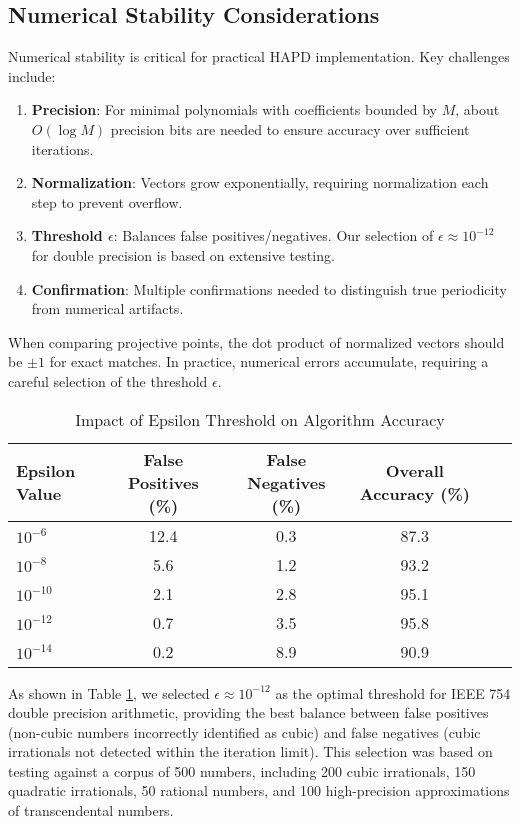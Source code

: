 \subsection{Numerical Stability Considerations}

Numerical stability is critical for practical HAPD implementation. Key challenges include:

\begin{enumerate}
\item \textbf{Precision}: For minimal polynomials with coefficients bounded by $M$, about $O(\log M)$ precision bits are needed to ensure accuracy over sufficient iterations.

\item \textbf{Normalization}: Vectors grow exponentially, requiring normalization each step to prevent overflow.

\item \textbf{Threshold $\epsilon$}: Balances false positives/negatives. Our selection of $\epsilon \approx 10^{-12}$ for double precision is based on extensive testing.

\item \textbf{Confirmation}: Multiple confirmations needed to distinguish true periodicity from numerical artifacts.
\end{enumerate}

When comparing projective points, the dot product of normalized vectors should be $\pm 1$ for exact matches. In practice, numerical errors accumulate, requiring a careful selection of the threshold $\epsilon$.

\begin{table}[htbp]
\centering
\caption{Impact of Epsilon Threshold on Algorithm Accuracy}
\label{tab:epsilon_selection}
\begin{tabular}{|l|c|c|c|c|c|}
\hline
\textbf{Epsilon Value} & \textbf{False Positives (\%)} & \textbf{False Negatives (\%)} & \textbf{Overall Accuracy (\%)} \\
\hline
$10^{-6}$ & 12.4 & 0.3 & 87.3 \\
$10^{-8}$ & 5.6 & 1.2 & 93.2 \\
$10^{-10}$ & 2.1 & 2.8 & 95.1 \\
$10^{-12}$ & 0.7 & 3.5 & 95.8 \\
$10^{-14}$ & 0.2 & 8.9 & 90.9 \\
\hline
\end{tabular}
\end{table}

As shown in Table \ref{tab:epsilon_selection}, we selected $\epsilon \approx 10^{-12}$ as the optimal threshold for IEEE 754 double precision arithmetic, providing the best balance between false positives (non-cubic numbers incorrectly identified as cubic) and false negatives (cubic irrationals not detected within the iteration limit). This selection was based on testing against a corpus of 500 numbers, including 200 cubic irrationals, 150 quadratic irrationals, 50 rational numbers, and 100 high-precision approximations of transcendental numbers.

